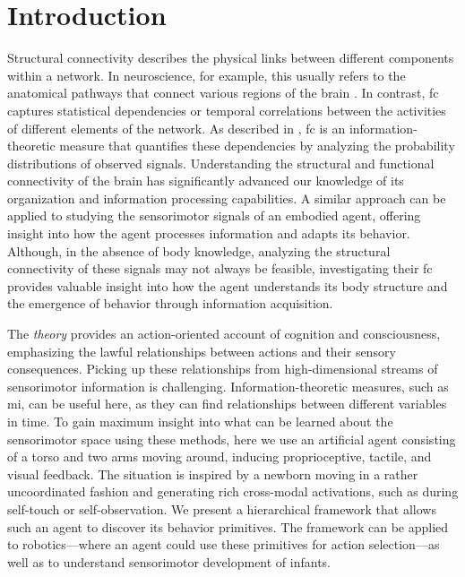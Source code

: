 \documentclass[letterpaper, 10 pt, conference]{ieeeconf}  %
\begin{document}
\section{Introduction}\label{sec:intro}
Structural connectivity describes the physical links between different components within a network. In neuroscience, for example, this usually refers to the anatomical pathways that connect various regions of the brain \cite{Park2013StructuralAF}. In contrast, \acf{fc} captures statistical dependencies or temporal correlations between the activities of different elements of the network. As described in \cite{Friston2011FunctionalAE}, \ac{fc} is an information-theoretic measure that quantifies these dependencies by analyzing the probability distributions of observed signals. %
Understanding the structural and functional connectivity of the brain has significantly advanced our knowledge of its organization and information processing capabilities. A similar approach can be applied to studying the sensorimotor signals of an embodied agent, offering insight into how the agent processes information and adapts its behavior. Although, in the absence of body knowledge, analyzing the structural connectivity of these signals may not always be feasible, investigating their \ac{fc} provides valuable insight into how the agent understands its body structure and the emergence of behavior through information acquisition. 

The  \emph{theory} \cite{oregan2001sensorimotor} provides an action-oriented account of cognition and consciousness, emphasizing the lawful relationships between actions and their sensory consequences. Picking up these relationships from high-dimensional streams of sensorimotor information is challenging. Information-theoretic measures, such as \ac{mi}, can be useful here, as they can find relationships between different variables in time. To gain maximum insight into what can be learned about the sensorimotor space using these methods, here we use an artificial agent consisting of a torso and two arms moving around, inducing proprioceptive, tactile, and visual feedback. The situation is inspired by a newborn moving in a rather uncoordinated fashion and generating rich cross-modal activations, such as during self-touch or self-observation. We present a hierarchical framework that allows such an agent to discover its behavior primitives. The framework can be applied to robotics---where an agent could use these primitives for action selection---as well as to understand sensorimotor development of infants.
\end{document}
